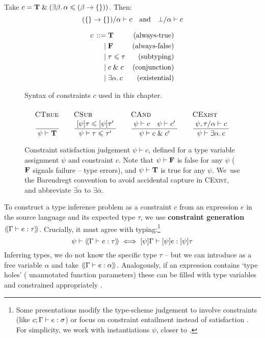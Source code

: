 \begin{example}
    Take $c = \tru \und \left( \exists \beta \ldotp \alpha \sub (\beta \to \flrec{}) \right)$. Then: 
    $$ (\flrec{} \to \flrec{})/\alpha \vdash c \quad\text{and}\quad \bot/\alpha \vdash c$$
\end{example}

\begin{figure}
    \centering
    \begin{align*}
        {c} \,::=&\; 
        \mathbf T
        & \text{(always-true)}
        \\ \mid&\;
        \mathbf F
        & \text{(always-false)}
        \\ \mid&\;
        \tau \leqslant \tau 
        & \text{(subtyping)}
        \\ \mid&\;
        c \;\&\; c
         & \text{(conjunction)}
        \\ \mid&\; 
        \exists \alpha \ldotp c
        & \text{(existential)}
    \end{align*}
    \caption{Syntax of constraints $c$ used in this chapter.}
    \label{fig:constraints}
\end{figure}

\begin{figure}
    \centering
    $$
    \irule{CTrue}{}{\psi \vdash \tru}
    \quad
    \irule{CSub}{\substx \psi \tau \sub \substx \psi \tau'}{\psi \vdash \tau \sub \tau'}
    \quad
    \irule{CAnd}{\psi \vdash c \quad \psi \vdash c'}{\psi \vdash c \und c'}
    \quad 
    \irule{CExist}{\psi, \tau/\alpha \vdash c}{\psi \vdash \exists \alpha \ldotp c}
    $$
    \caption{Constraint satisfaction judgement $\psi \vdash c$, defined for a type variable assignment $\psi$ and constraint $c$. Note that $\psi \vdash \mathbf F$ is false for any $\psi$ ($\mathbf F$ signals failure -- type errors), and $\psi \vdash \mathbf T$ is true for any $\psi$. We~use the Barendregt convention to avoid accidental capture in \textsc{CExist}, and abbreviate $\overline {\exists \alpha}$ to $\exists \overline{\alpha}$.}
    \label{fig:satisfaction}
\end{figure}

\needspace{6em}
To construct a type inference problem as a constraint $c$ from an expression $e$ in the source language and its expected type $\tau$, we use \textbf{constraint generation} $\cstr{\Gamma}{e}{\tau}$. Crucially, it must agree with typing:\footnote{Some presentations modify the type-scheme judgement to involve constraints (like $c; \Gamma \vdash e : \sigma$) \cite{essence-of-ml-type-inference} or focus on constraint entailment instead of satisfaction \cite{constraint-based-hm}. For simplicity, we work with instantiations $\psi$, closer to \eg{} \cite[Section 3.4]{constraint-based-freeze-ml}.}
$$ \psi \vdash \cstr{\Gamma}{e}{\tau} \iff \substx{\psi}\Gamma \vdash \substx{\psi}{e} : \substx \psi \tau $$
Inferring types, we do not know the specific type $\tau$ -- but we can introduce as a free variable $\alpha$ and take $\cstr{\Gamma}{e}{\alpha}$. Analogously, if an expression contains `type holes' (\eg{} unannotated function parameters) these can be filled with type variables and constrained appropriately \cite{tapl}.

